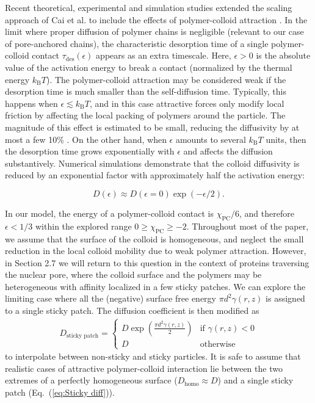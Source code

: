 \documentclass[12pt, a4paper]{article}
\begin{document}
Recent theoretical, experimental and simulation studies extended the scaling approach of Cai et al. \cite{Cai2011} to include the effects of polymer-colloid attraction \cite{Yamamoto2018, Carroll2018}.
In the limit where proper diffusion of polymer chains is negligible (relevant to our case of pore-anchored chains), the characteristic desorption time of a single polymer-colloid contact $\tau_\text{des}(\epsilon)$ appears as an extra timescale.
Here, $\epsilon > 0$ is the absolute value of the activation energy to break a contact (normalized by the thermal energy $k_\text{B} T$).
The polymer-colloid attraction may be considered weak if the desorption time is much smaller than the self-diffusion time.
Typically, this happens when $\epsilon \lesssim k_\text{B} T$, and in this case attractive forces only modify local friction by affecting the local packing of polymers around the particle.
The magnitude of this effect is estimated to be small, reducing the diffusivity by at most a few 10\% \cite{Yamamoto2011}.
On the other hand, when $\epsilon$ amounts to several $k_\text{B} T$ units, then the desorption time grows exponentially with $\epsilon$ and affects the diffusion substantively.
Numerical simulations \cite{Yamamoto2018} demonstrate that the colloid diffusivity is reduced by an exponential factor with approximately half the activation energy:

\begin{equation}
    D(\epsilon)\approx D(\epsilon=0) \exp (-\epsilon / 2).
    \label{eq:Yamamoto}
\end{equation}

In our model, the energy of a polymer-colloid contact is $\chi_{\text{PC}}/6$, and therefore $\epsilon < 1/3$ within the explored range $0\geq\chi_{\text{PC}}\geq-2$.
Throughout most of the paper, we assume that the surface of the colloid is homogeneous, and neglect the small reduction in the local colloid mobility due to weak polymer attraction.
However, in Section 2.7 we will return to this question in the context of proteins traversing the nuclear pore, where the colloid surface and the polymers may be heterogeneous with affinity localized in a few sticky patches.
We can explore the limiting case where all the (negative) surface free energy $\pi d^2 \gamma(r,z)$ is assigned to a single sticky patch.
The diffusion coefficient is then modified as
\begin{eqnarray}
    D_{\text{sticky patch}} = 
    \begin{cases}
        D \exp(\frac{\pi d^2 \gamma(r,z)}{2}) & \text{if } \gamma(r,z) < 0 \\
        D & \text{otherwise}
    \end{cases}
     \label{eq:Sticky diff}
\end{eqnarray}
to interpolate between non-sticky and sticky particles.
It is safe to assume that realistic cases of attractive polymer-colloid interaction lie between the two extremes of a perfectly homogeneous surface ($D_\text{homo} \approx D$) and a single sticky patch (Eq.~(\ref{eq:Sticky diff})).
\end{document}
